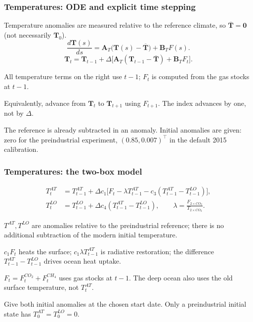 \documentclass[xcolor=x11names,compress,aspectratio=169]{beamer}%
\makeatletter
\renewenvironment{itemize}{\begin{compactitemize}[<+-| alert@+>]}{\end{compactitemize}}
\makeatother
\begin{document}
\begin{frame}
\frametitle{Temperatures: ODE and explicit time stepping}
\small
Temperature anomalies are measured relative to the reference climate,
so $\overline{\mathbf T}=\mathbf 0$ (not necessarily $\mathbf T_0$).
\[
\frac{d\mathbf T(s)}{ds}
=\mathbf A_T\big(\mathbf T(s)-\overline{\mathbf T}\big)
+\mathbf B_T F(s).
\]
\[
\boxed{\mathbf T_t=\mathbf T_{t-1}
+\Delta\Big[\mathbf A_T(\mathbf T_{t-1}-\overline{\mathbf T})
+\mathbf B_T F_t\Big].}
\]
\begin{itemize}
\item All temperature terms on the right use $t-1$;
$F_t$ is computed from the gas stocks at $t-1$.
\item Equivalently, advance from $\mathbf T_t$ to $\mathbf T_{t+1}$
using $F_{t+1}$. The index advances by one, not by $\Delta$.
\item The reference is already subtracted in an anomaly.
Initial anomalies are given: zero for the preindustrial experiment,
$(0.85,0.007)^\top$ in the default 2015 calibration.
\end{itemize}
\transboxout
\end{frame}
%

\begin{frame}
\frametitle{Temperatures: the two-box model}
\small
\[
\begin{aligned}
T^{AT}_t &= T^{AT}_{t-1}+\Delta c_1\Big[
F_t-\lambda T^{AT}_{t-1}
-c_3(T^{AT}_{t-1}-T^{LO}_{t-1})\Big],\\[0.5em]
T^{LO}_t &= T^{LO}_{t-1}
+\Delta c_4(T^{AT}_{t-1}-T^{LO}_{t-1}),
\qquad \lambda=\frac{F_{2\times CO_2}}{T_{2\times CO_2}}.
\end{aligned}
\]
\begin{itemize}
\item $T^{AT},T^{LO}$ are anomalies relative to the preindustrial reference;
there is no additional subtraction of the modern initial temperature.
\item $c_1F_t$ heats the surface; $c_1\lambda T^{AT}_{t-1}$ is radiative
restoration; the difference $T^{AT}_{t-1}-T^{LO}_{t-1}$ drives ocean heat uptake.
\item $F_t=F^{CO_2}_t+F^{CH_4}_t$ uses gas stocks at $t-1$.
The deep ocean also uses the old surface temperature, not $T^{AT}_t$.
\item Give both initial anomalies at the chosen start date.
Only a preindustrial initial state has $T^{AT}_0=T^{LO}_0=0$.
\end{itemize}
\transboxout
\end{frame}
%
\end{document}

